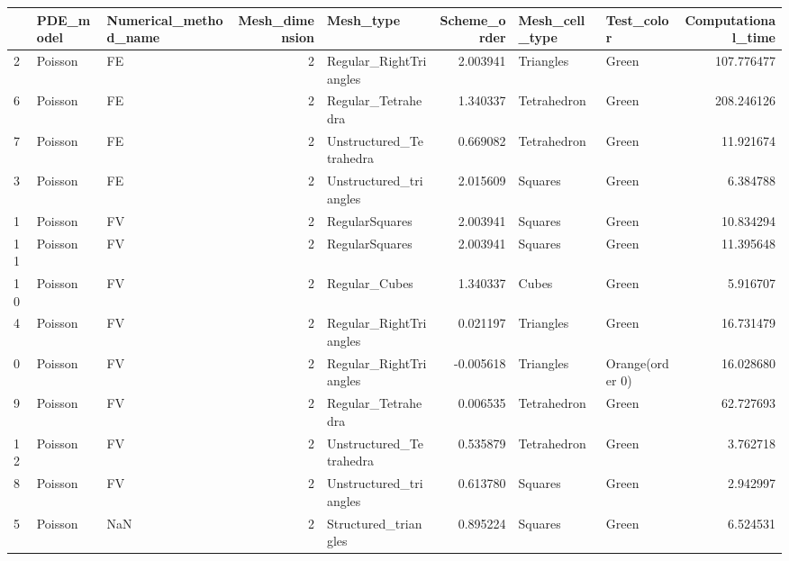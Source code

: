 \begin{tabular}{lllrlrllr}
\toprule
{} & PDE\_model & Numerical\_method\_name &  Mesh\_dimension &                Mesh\_type &  Scheme\_order & Mesh\_cell\_type &       Test\_color &  Computational\_time \\
\midrule
2  &   Poisson &                    FE &               2 &   Regular\_RightTriangles &      2.003941 &      Triangles &            Green &          107.776477 \\
6  &   Poisson &                    FE &               2 &       Regular\_Tetrahedra &      1.340337 &    Tetrahedron &            Green &          208.246126 \\
7  &   Poisson &                    FE &               2 &  Unstructured\_Tetrahedra &      0.669082 &    Tetrahedron &            Green &           11.921674 \\
3  &   Poisson &                    FE &               2 &   Unstructured\_triangles &      2.015609 &        Squares &            Green &            6.384788 \\
1  &   Poisson &                    FV &               2 &           RegularSquares &      2.003941 &        Squares &            Green &           10.834294 \\
11 &   Poisson &                    FV &               2 &           RegularSquares &      2.003941 &        Squares &            Green &           11.395648 \\
10 &   Poisson &                    FV &               2 &            Regular\_Cubes &      1.340337 &          Cubes &            Green &            5.916707 \\
4  &   Poisson &                    FV &               2 &   Regular\_RightTriangles &      0.021197 &      Triangles &            Green &           16.731479 \\
0  &   Poisson &                    FV &               2 &   Regular\_RightTriangles &     -0.005618 &      Triangles &  Orange(order 0) &           16.028680 \\
9  &   Poisson &                    FV &               2 &       Regular\_Tetrahedra &      0.006535 &    Tetrahedron &            Green &           62.727693 \\
12 &   Poisson &                    FV &               2 &  Unstructured\_Tetrahedra &      0.535879 &    Tetrahedron &            Green &            3.762718 \\
8  &   Poisson &                    FV &               2 &   Unstructured\_triangles &      0.613780 &        Squares &            Green &            2.942997 \\
5  &   Poisson &                   NaN &               2 &     Structured\_triangles &      0.895224 &        Squares &            Green &            6.524531 \\
\bottomrule
\end{tabular}
